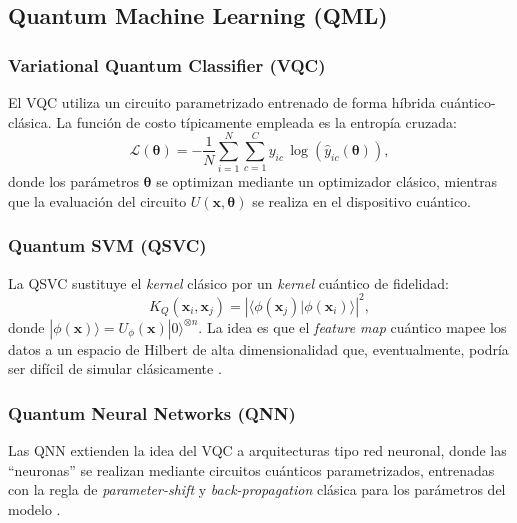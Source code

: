 \subsection{Quantum Machine Learning (QML)}

\subsubsection{Variational Quantum Classifier (VQC)}
El VQC \citep{havlicek2019} utiliza un circuito parametrizado entrenado
de forma h\'ibrida cu\'antico-cl\'asica. La funci\'on de costo
t\'ipicamente empleada es la entrop\'ia cruzada:
\begin{equation}
\mathcal{L}(\boldsymbol{\theta}) = -\frac{1}{N}\sum_{i=1}^{N}\sum_{c=1}^{C}
y_{ic}\,\log\!\left(\hat{y}_{ic}(\boldsymbol{\theta})\right),
\end{equation}
donde los par\'ametros $\boldsymbol{\theta}$ se optimizan mediante un
optimizador cl\'asico, mientras que la evaluaci\'on del circuito
$U(\mathbf{x},\boldsymbol{\theta})$ se realiza en el dispositivo
cu\'antico.

\subsubsection{Quantum SVM (QSVC)}
La QSVC \citep{rebentrost2014, havlicek2019} sustituye el \textit{kernel}
cl\'asico por un \textit{kernel} cu\'antico de fidelidad:
\begin{equation}
K_Q(\mathbf{x}_i, \mathbf{x}_j) =
\left|\langle\phi(\mathbf{x}_j)|\phi(\mathbf{x}_i)\rangle\right|^2,
\end{equation}
donde $|\phi(\mathbf{x})\rangle = U_\phi(\mathbf{x})|0\rangle^{\otimes n}$.
La idea es que el \textit{feature map} cu\'antico mapee los datos a un
espacio de Hilbert de alta dimensionalidad que, eventualmente, podr\'ia
ser dif\'icil de simular cl\'asicamente \citep{schuld2019}.

\subsubsection{Quantum Neural Networks (QNN)}
Las QNN extienden la idea del VQC a arquitecturas tipo red neuronal,
donde las ``neuronas'' se realizan mediante circuitos cu\'anticos
parametrizados, entrenadas con la regla de \emph{parameter-shift}
\citep{schuld2019} y \textit{back-propagation} cl\'asica para los
par\'ametros del modelo \citep{yu2025}.

